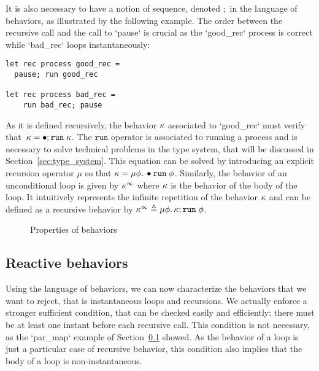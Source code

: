 \documentclass[9pt,preprint]{sigplanconf}
\newcommand{\deq}{\triangleq}
\begin{document}
It is also necessary to have a notion of sequence, denoted $;$ in the language of behaviors, as illustrated by the following example. The order between the recursive call and the call to `pause` is crucial as the `good_rec` process is correct while `bad_rec` loops instantaneously:
\begin{lstlisting}
let rec process good_rec =
  pause; run good_rec

let rec process bad_rec =
    run bad_rec; pause
\end{lstlisting}
As it is defined recursively, the behavior  $\kappa$  associated to `good_rec` must verify that~$ \kappa = \bullet ; \mathtt{run}\; \kappa$. The $\mathtt{run}$ operator is associated to running a process and is necessary to solve technical problems in the type system, that will be discussed in Section~\ref{sec:type_system}. This equation can be solved by introducing an explicit recursion operator $\mu$ so that $\kappa = \mu \phi.\, \bullet{\mathtt{run}\; \phi}$. Similarly, the behavior of an unconditional loop is given by $\kappa^\infty$ where $\kappa$ is the behavior of the body of the loop. It intuitively represents the infinite repetition of the behavior $\kappa$ and can be defined as a recursive behavior by $\effinf{\rk} \deq \effrec{\effvar}{\effcon{\rk}{\effrun{\effvar}}}$. 

\begin{figure}[t]



\caption{Properties of behaviors}
\end{figure}


\subsection{Reactive behaviors}

Using the language of behaviors, we can now characterize the behaviors that we want to reject, that is instantaneous loops and recursions. We actually enforce a stronger sufficient condition, that can be checked easily and efficiently: there must be at least one instant before each recursive call. This condition is not necessary, as the `par_map` example of Section~\ref{} showed. As the behavior of a loop is just a particular case of recursive behavior, this condition also implies that the body of a loop is non-instantaneous.
\end{document}
